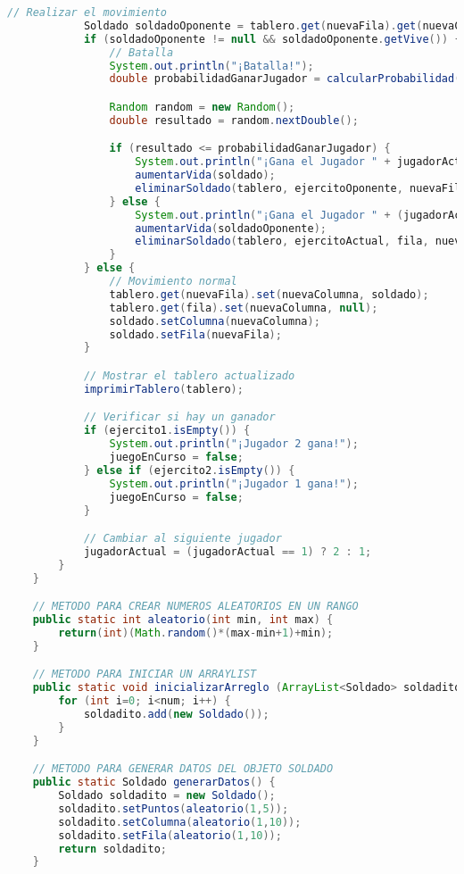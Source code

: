 \documentclass{article}
\begin{document}
\begin{itemize}
\begin{itemize}
\begin{lstlisting}[language=java]
            // Realizar el movimiento
            Soldado soldadoOponente = tablero.get(nuevaFila).get(nuevaColumna);
            if (soldadoOponente != null && soldadoOponente.getVive()) {
                // Batalla
                System.out.println("¡Batalla!");
                double probabilidadGanarJugador = calcularProbabilidad(soldado.getPuntos(), soldadoOponente.getPuntos());

                Random random = new Random();
                double resultado = random.nextDouble();

                if (resultado <= probabilidadGanarJugador) {
                    System.out.println("¡Gana el Jugador " + jugadorActual + "!");
                    aumentarVida(soldado);
                    eliminarSoldado(tablero, ejercitoOponente, nuevaFila, nuevaColumna);
                } else {
                    System.out.println("¡Gana el Jugador " + (jugadorActual == 1 ? 2 : 1) + "!");
                    aumentarVida(soldadoOponente);
                    eliminarSoldado(tablero, ejercitoActual, fila, nuevaColumna);
                }
            } else {
                // Movimiento normal
                tablero.get(nuevaFila).set(nuevaColumna, soldado);
                tablero.get(fila).set(nuevaColumna, null);
                soldado.setColumna(nuevaColumna);
                soldado.setFila(nuevaFila);
            }

            // Mostrar el tablero actualizado
            imprimirTablero(tablero);

            // Verificar si hay un ganador
            if (ejercito1.isEmpty()) {
                System.out.println("¡Jugador 2 gana!");
                juegoEnCurso = false;
            } else if (ejercito2.isEmpty()) {
                System.out.println("¡Jugador 1 gana!");
                juegoEnCurso = false;
            }

            // Cambiar al siguiente jugador
            jugadorActual = (jugadorActual == 1) ? 2 : 1;
        }
	}

	// METODO PARA CREAR NUMEROS ALEATORIOS EN UN RANGO
	public static int aleatorio(int min, int max) {
		return(int)(Math.random()*(max-min+1)+min);
	}

	// METODO PARA INICIAR UN ARRAYLIST
	public static void inicializarArreglo (ArrayList<Soldado> soldadito, int num) {
		for (int i=0; i<num; i++) {
			soldadito.add(new Soldado());
		}
	}

	// METODO PARA GENERAR DATOS DEL OBJETO SOLDADO
	public static Soldado generarDatos() {
		Soldado soldadito = new Soldado();
		soldadito.setPuntos(aleatorio(1,5));
		soldadito.setColumna(aleatorio(1,10));
		soldadito.setFila(aleatorio(1,10));
		return soldadito;
	}


\end{lstlisting}
\end{itemize}
\end{itemize}
\end{document}
